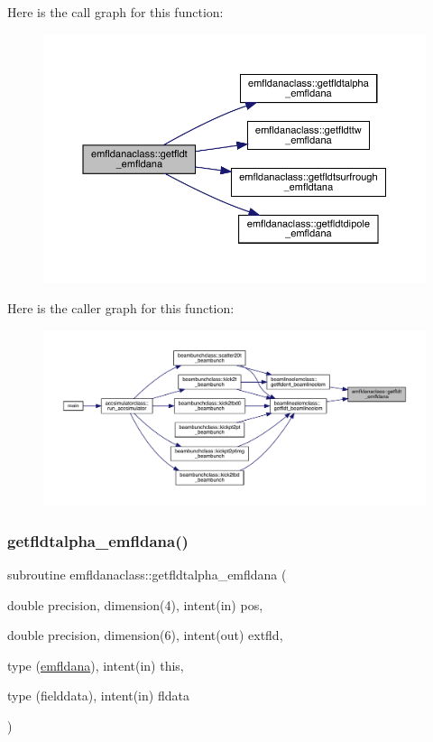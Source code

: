 Here is the call graph for this function\+:\nopagebreak
\begin{figure}[H]
\begin{center}
\leavevmode
\includegraphics[width=350pt]{namespaceemfldanaclass_a7ecbabd3d9e65aadaf2e8ccb096c6eed_cgraph}
\end{center}
\end{figure}
Here is the caller graph for this function\+:\nopagebreak
\begin{figure}[H]
\begin{center}
\leavevmode
\includegraphics[width=350pt]{namespaceemfldanaclass_a7ecbabd3d9e65aadaf2e8ccb096c6eed_icgraph}
\end{center}
\end{figure}
\mbox{\label{namespaceemfldanaclass_a8e64e65ca00c486db83f7f7152aa5744}} 
\subsubsection{\texorpdfstring{getfldtalpha\_emfldana()}{getfldtalpha\_emfldana()}}
{\footnotesize\ttfamily subroutine emfldanaclass\+::getfldtalpha\+\_\+emfldana (\begin{DoxyParamCaption}\item[{double precision, dimension(4), intent(in)}]{pos,  }\item[{double precision, dimension(6), intent(out)}]{extfld,  }\item[{type (\mbox{\hyperlink{namespaceemfldanaclass_structemfldanaclass_1_1emfldana}{emfldana}}), intent(in)}]{this,  }\item[{type (fielddata), intent(in)}]{fldata }\end{DoxyParamCaption})}



